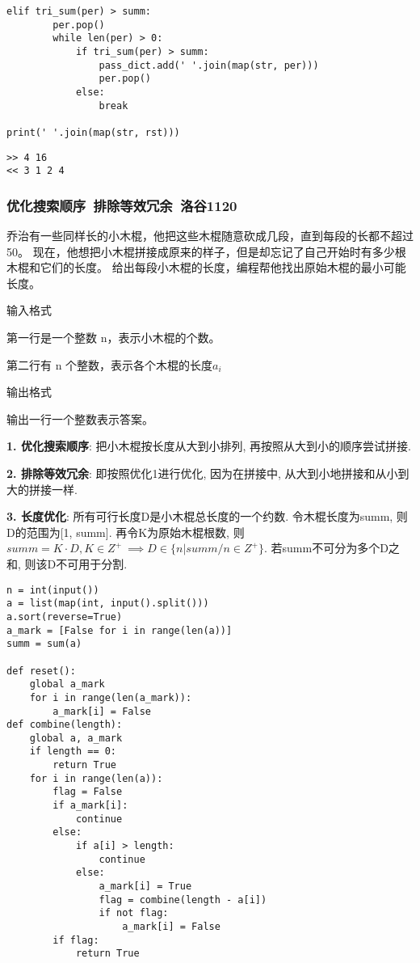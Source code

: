 \documentclass[../main]{subfiles}
\begin{document}
\begin{sloppy}
\begin{lstlisting}[style = Python]
    elif tri_sum(per) > summ:
        per.pop()
        while len(per) > 0:
            if tri_sum(per) > summ:
                pass_dict.add(' '.join(map(str, per)))
                per.pop()
            else:
                break

print(' '.join(map(str, rst)))
\end{lstlisting}

\begin{verbatim}
>> 4 16
<< 3 1 2 4
\end{verbatim}

\newpage
        \subsubsection{优化搜索顺序\ 排除等效冗余\ 洛谷1120}

        乔治有一些同样长的小木棍，他把这些木棍随意砍成几段，直到每段的长都不超过 50。
        现在，他想把小木棍拼接成原来的样子，但是却忘记了自己开始时有多少根木棍和它们的长度。
        给出每段小木棍的长度，编程帮他找出原始木棍的最小可能长度。

        输入格式

        第一行是一个整数 n，表示小木棍的个数。
        
        第二行有 n 个整数，表示各个木棍的长度$a_i$

        输出格式
        
        输出一行一个整数表示答案。

        \textbf{1. 优化搜索顺序}: 把小木棍按长度从大到小排列, 再按照从大到小的顺序尝试拼接. 

        \textbf{2. 排除等效冗余}: 即按照优化1进行优化, 因为在拼接中, 从大到小地拼接和从小到大的拼接一样.

        \textbf{3. 长度优化}: 所有可行长度D是小木棍总长度的一个约数. 令木棍长度为summ, 则D的范围为[1, summ]. 再令K为原始木棍根数, 则$summ = K\cdot D, K \in Z^+\ \implies D \in \{n | summ/n \in Z^+\}$. 若summ不可分为多个D之和, 则该D不可用于分割.

\begin{lstlisting}[style = Python]
n = int(input())
a = list(map(int, input().split()))
a.sort(reverse=True)
a_mark = [False for i in range(len(a))]
summ = sum(a)

def reset():
    global a_mark
    for i in range(len(a_mark)):
        a_mark[i] = False
def combine(length):
    global a, a_mark
    if length == 0:
        return True
    for i in range(len(a)):
        flag = False
        if a_mark[i]:
            continue
        else:
            if a[i] > length:
                continue
            else:
                a_mark[i] = True
                flag = combine(length - a[i])
                if not flag:
                    a_mark[i] = False
        if flag:
            return True


\end{lstlisting}
\end{sloppy}
\end{document}
